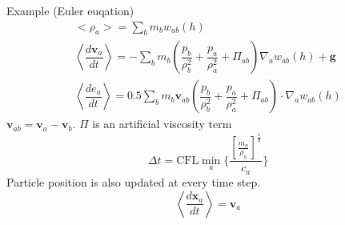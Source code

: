 \documentclass{beamer}
\begin{document}
\begin{frame}{Example (Euler euqation) }
\begin{align}
<\rho_a> = \sum_b m_b w_{ab} \left(h\right) \label{eq:ns-sph-d} \\
\left\langle\dfrac{d \textbf{v}_a}{d t}\right\rangle = -\sum_b m_b \left(\dfrac{p_b}{\rho_b^2} + \dfrac{p_a}{\rho_a^2} + \Pi_{ab}\right) \nabla_a w_{a b}\left(h\right) +\textbf{g} \label{eq:ns-sph-v} \\
\left\langle\dfrac{d e_a}{d t}\right\rangle=
 0.5\sum_b m_b \textbf{v}_{a b}\left(\dfrac{p_b}{\rho_b^2} + \dfrac{p_a}{\rho_a^2} + \Pi_{ab}\right) \cdot \nabla_a w_{a b}\left(h\right) \label{eq:ns-sph-e}
\end{align}
$\textbf{v}_{a b} = \textbf{v}_a - \textbf{v}_b$. $\Pi$ is an artificial viscosity term
\begin{equation}
\Delta t = \textrm{CFL} \min_a \bigg \lbrace \dfrac{\left[\frac{m_a}{\rho_a}\right]^{\frac{1}{d}}}{c_a} \bigg \rbrace
\end{equation}
Particle position is also updated at every time step.
\begin{equation}
\left\langle\dfrac{d \textbf{x}_a}{dt}\right\rangle = \textbf{v}_a \label{eq:SPH-update-pos}
\end{equation}
\end{frame}
\end{document}

